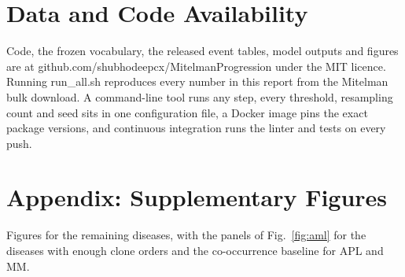 \documentclass[conference]{IEEEtran}
\begin{document}
\section{Data and Code Availability}
Code, the frozen vocabulary, the released event tables, model outputs and figures are at github.com/shubhodeepcx/MitelmanProgression under the MIT licence. Running run\_all.sh reproduces every number in this report from the Mitelman bulk download. A command-line tool runs any step, every threshold, resampling count and seed sits in one configuration file, a Docker image pins the exact package versions, and continuous integration runs the linter and tests on every push.

\section{Appendix: Supplementary Figures}
Figures for the remaining diseases, with the panels of Fig.~\ref{fig:aml} for the diseases with enough clone orders and the co-occurrence baseline for APL and MM.
\end{document}
